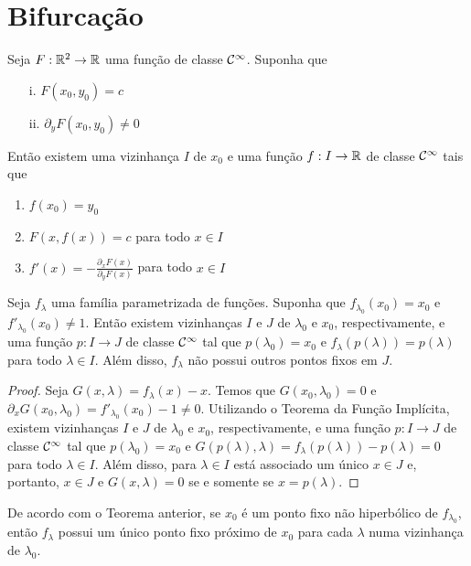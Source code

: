 \section{Bifurcação}

\begin{theorem}
Seja $F: \mathbb{R}^2 \to \mathbb{R}$ uma função de classe $\mathcal{C}^\infty$. Suponha que
\begin{enumerate}
\item[i.] $F(x_0, y_0) = c$
\item[ii.] $\partial_y F(x_0, y_0) \neq 0$
\end{enumerate} 
Então existem uma vizinhança $I$ de $x_0$ e uma função $f: I \to \mathbb{R}$ de classe $\mathcal{C}^\infty$ tais que
\begin{enumerate}
\item $f(x_0) = y_0$
\item $F(x, f(x)) = c$ para todo $x \in I$
\item $f'(x) = -\frac{\partial_x F(x)}{\partial_y F(x)}$ para todo $x \in I$
\end{enumerate}
\end{theorem}

\begin{theorem}
Seja $f_\lambda$ uma família parametrizada de funções. Suponha que $f_{\lambda_0}(x_0) = x_0$ e $f'_{\lambda_0}(x_0) \neq 1$. Então existem vizinhanças $I$ e $J$ de $\lambda_0$ e $x_0$, respectivamente, e uma função $p: I \to J$ de classe $\mathcal{C}^\infty$ tal que $p(\lambda_0) = x_0$ e $f_\lambda(p(\lambda)) = p(\lambda)$ para todo $\lambda \in I$. Além disso, $f_\lambda$ não possui outros pontos fixos em $J$.
\end{theorem}

\begin{proof}
Seja $G(x, \lambda) = f_\lambda(x) - x$. Temos que $G(x_0, \lambda_0) = 0$ e $\partial_x G(x_0, \lambda_0) = f'_{\lambda_0}(x_0) - 1 \neq 0$. Utilizando o Teorema da Função Implícita, existem vizinhanças $I$ e $J$ de $\lambda_0$ e $x_0$, respectivamente, e uma função $p: I \to J$ de classe $\mathcal{C}^\infty$ tal que $p(\lambda_0) = x_0$ e $G(p(\lambda), \lambda) = f_\lambda(p(\lambda)) - p(\lambda) = 0$ para todo $\lambda \in I$. Além disso, para $\lambda \in I$ está associado um único $x \in J$ e, portanto, $x \in J$ e $G(x, \lambda) = 0$ se e somente se $x = p(\lambda)$.
\end{proof}

De acordo com o Teorema anterior, se $x_0$ é um ponto fixo não hiperbólico de $f_{\lambda_0}$, então $f_\lambda$ possui um único ponto fixo próximo de $x_0$ para cada $\lambda$ numa vizinhança de $\lambda_0$.
 

